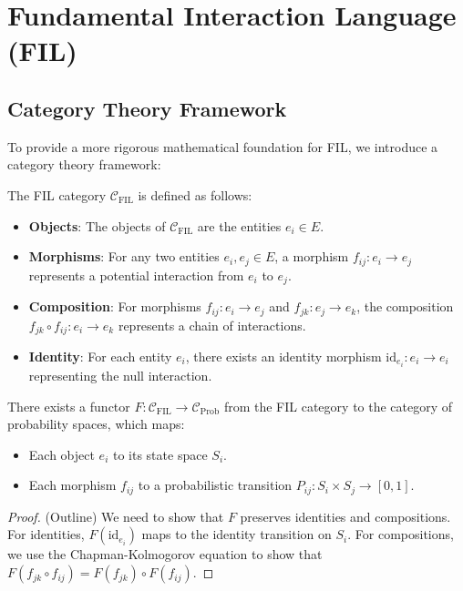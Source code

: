 \section{Fundamental Interaction Language (FIL)}

\subsection{Category Theory Framework}

To provide a more rigorous mathematical foundation for FIL, we introduce a category theory framework:

\begin{definition}
The FIL category $\mathcal{C}_{\text{FIL}}$ is defined as follows:
\begin{itemize}
    \item \textbf{Objects}: The objects of $\mathcal{C}_{\text{FIL}}$ are the entities $e_i \in E$.
    \item \textbf{Morphisms}: For any two entities $e_i, e_j \in E$, a morphism $f_{ij}: e_i \rightarrow e_j$ represents a potential interaction from $e_i$ to $e_j$.
    \item \textbf{Composition}: For morphisms $f_{ij}: e_i \rightarrow e_j$ and $f_{jk}: e_j \rightarrow e_k$, the composition $f_{jk} \circ f_{ij}: e_i \rightarrow e_k$ represents a chain of interactions.
    \item \textbf{Identity}: For each entity $e_i$, there exists an identity morphism $\mathrm{id}_{e_i}: e_i \rightarrow e_i$ representing the null interaction.
\end{itemize}
\end{definition}

\begin{theorem}
There exists a functor $F: \mathcal{C}_{\text{FIL}} \rightarrow \mathcal{C}_{\text{Prob}}$ from the FIL category to the category of probability spaces, which maps:
\begin{itemize}
    \item Each object $e_i$ to its state space $S_i$.
    \item Each morphism $f_{ij}$ to a probabilistic transition $P_{ij}: S_i \times S_j \rightarrow [0,1]$.
\end{itemize}
\end{theorem}

\begin{proof}
(Outline) We need to show that $F$ preserves identities and compositions. For identities, $F(\mathrm{id}_{e_i})$ maps to the identity transition on $S_i$. For compositions, we use the Chapman-Kolmogorov equation to show that $F(f_{jk} \circ f_{ij}) = F(f_{jk}) \circ F(f_{ij})$.
\end{proof}

